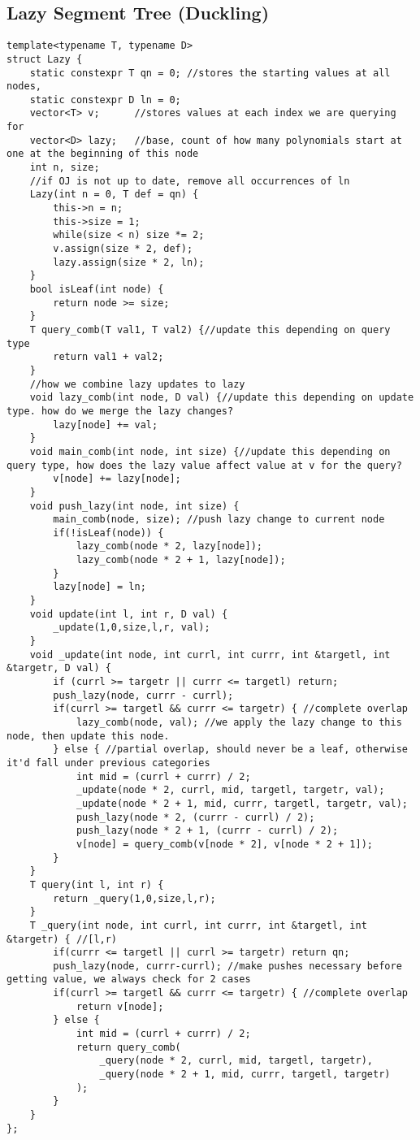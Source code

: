 \documentclass[8pt, headheight=10pt]{scrartcl}
\begin{document}
\begin{multicols*}{3}
\subsection{Lazy Segment Tree (Duckling)}
\begin{lstlisting}
template<typename T, typename D>
struct Lazy {
    static constexpr T qn = 0; //stores the starting values at all nodes, 
    static constexpr D ln = 0;
    vector<T> v;      //stores values at each index we are querying for
    vector<D> lazy;   //base, count of how many polynomials start at one at the beginning of this node
    int n, size;
    //if OJ is not up to date, remove all occurrences of ln
    Lazy(int n = 0, T def = qn) {
        this->n = n;
        this->size = 1;
        while(size < n) size *= 2;
        v.assign(size * 2, def);
        lazy.assign(size * 2, ln);
    }
    bool isLeaf(int node) {
        return node >= size;
    }
    T query_comb(T val1, T val2) {//update this depending on query type
        return val1 + val2;
    }
    //how we combine lazy updates to lazy
    void lazy_comb(int node, D val) {//update this depending on update type. how do we merge the lazy changes?
        lazy[node] += val;
    }
    void main_comb(int node, int size) {//update this depending on query type, how does the lazy value affect value at v for the query?
        v[node] += lazy[node];
    }
    void push_lazy(int node, int size) {
        main_comb(node, size); //push lazy change to current node
        if(!isLeaf(node)) {
            lazy_comb(node * 2, lazy[node]);
            lazy_comb(node * 2 + 1, lazy[node]);
        }
        lazy[node] = ln;
    }
    void update(int l, int r, D val) {
        _update(1,0,size,l,r, val);
    }
    void _update(int node, int currl, int currr, int &targetl, int &targetr, D val) {
        if (currl >= targetr || currr <= targetl) return;
        push_lazy(node, currr - currl);
        if(currl >= targetl && currr <= targetr) { //complete overlap
            lazy_comb(node, val); //we apply the lazy change to this node, then update this node.
        } else { //partial overlap, should never be a leaf, otherwise it'd fall under previous categories 
            int mid = (currl + currr) / 2;
            _update(node * 2, currl, mid, targetl, targetr, val);
            _update(node * 2 + 1, mid, currr, targetl, targetr, val);
            push_lazy(node * 2, (currr - currl) / 2);
            push_lazy(node * 2 + 1, (currr - currl) / 2);
            v[node] = query_comb(v[node * 2], v[node * 2 + 1]);
        }
    }
    T query(int l, int r) {
        return _query(1,0,size,l,r);
    }
    T _query(int node, int currl, int currr, int &targetl, int &targetr) { //[l,r)
        if(currr <= targetl || currl >= targetr) return qn; 
        push_lazy(node, currr-currl); //make pushes necessary before getting value, we always check for 2 cases
        if(currl >= targetl && currr <= targetr) { //complete overlap
            return v[node];
        } else {
            int mid = (currl + currr) / 2;
            return query_comb(
                _query(node * 2, currl, mid, targetl, targetr),
                _query(node * 2 + 1, mid, currr, targetl, targetr)
            );
        }
    }
};
\end{lstlisting}


\end{multicols*}
\end{document}
